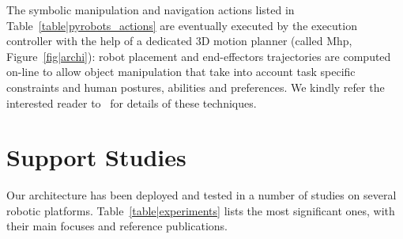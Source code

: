 \documentclass[preprint,3p,times]{elsarticle}
\begin{document}
The symbolic manipulation and navigation actions listed in
Table~\ref{table|pyrobots_actions} are eventually executed by the execution
controller with the help of a dedicated 3D motion planner (called {\sc Mhp},
Figure~\ref{fig|archi}): robot placement and end-effectors trajectories are
computed on-line to allow object manipulation that take into account task
specific constraints and human postures, abilities and preferences.  We kindly
refer the interested reader to~\cite{Sisbot2008, Mainprice2011, Pandey2011} for
details of these techniques.


%
%
%



\section{Support Studies}
\label{sec:expe}

Our architecture has been deployed and tested in a number of studies on
several robotic platforms. Table~\ref{table|experiments} lists the most
significant ones, with their main focuses and reference publications.
\end{document}
